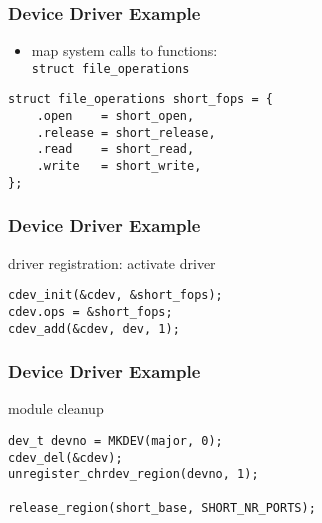 \documentclass[dvipsnames]{beamer}
\begin{document}
\begin{frame}[fragile]
  \frametitle{Device Driver Example}

  \begin{itemize}
    \item map system calls to functions:\\
      \lstinline|struct file_operations|
  \end{itemize}

  \begin{exampleblock}{}
    \begin{lstlisting}
struct file_operations short_fops = {
    .open    = short_open,
    .release = short_release,
    .read    = short_read,
    .write   = short_write,
};
    \end{lstlisting}
  \end{exampleblock}
\end{frame}

\begin{frame}[fragile]
  \frametitle{Device Driver Example}

  \begin{exampleblock}{driver registration: activate driver}
    \begin{lstlisting}
cdev_init(&cdev, &short_fops);
cdev.ops = &short_fops;
cdev_add(&cdev, dev, 1);
    \end{lstlisting}
  \end{exampleblock}
\end{frame}

\begin{frame}[fragile]
  \frametitle{Device Driver Example}

  \begin{exampleblock}{module cleanup}
    \begin{lstlisting}
dev_t devno = MKDEV(major, 0);
cdev_del(&cdev);
unregister_chrdev_region(devno, 1);

release_region(short_base, SHORT_NR_PORTS);
    \end{lstlisting}
  \end{exampleblock}
\end{frame}
%
%
%
\end{document}
